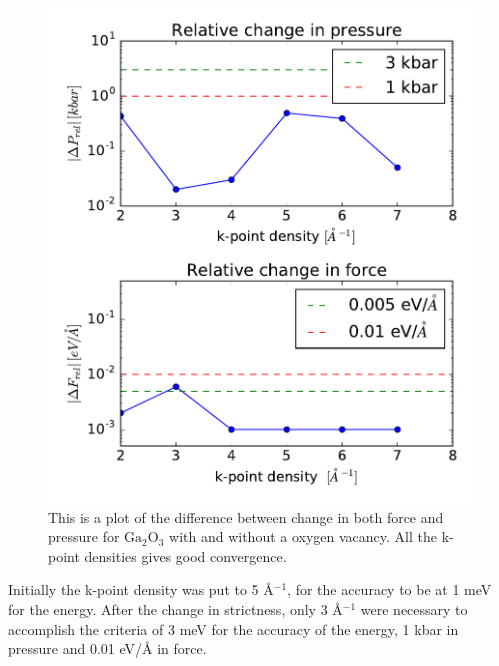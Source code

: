 \begin{figure}[H]
\includegraphics[width=\linewidth]{../fig/deltaforcepressrel_kpoints.pdf}\caption{This is a plot of the difference between change in both force and pressure for $\text{Ga}_2\text{O}_3$ with and without a oxygen vacancy. All the k-point densities gives good convergence.}\label{fig:forcepresskpoints}
\end{figure}

Initially the k-point density was put to 5 Å$^{-1}$, for the accuracy to be at 1 meV for the energy. After the change in strictness, only 3 Å$^{-1}$ were necessary to accomplish the criteria of 3 meV for the accuracy of the energy, 1 kbar in pressure and 0.01 eV/Å in force. 

